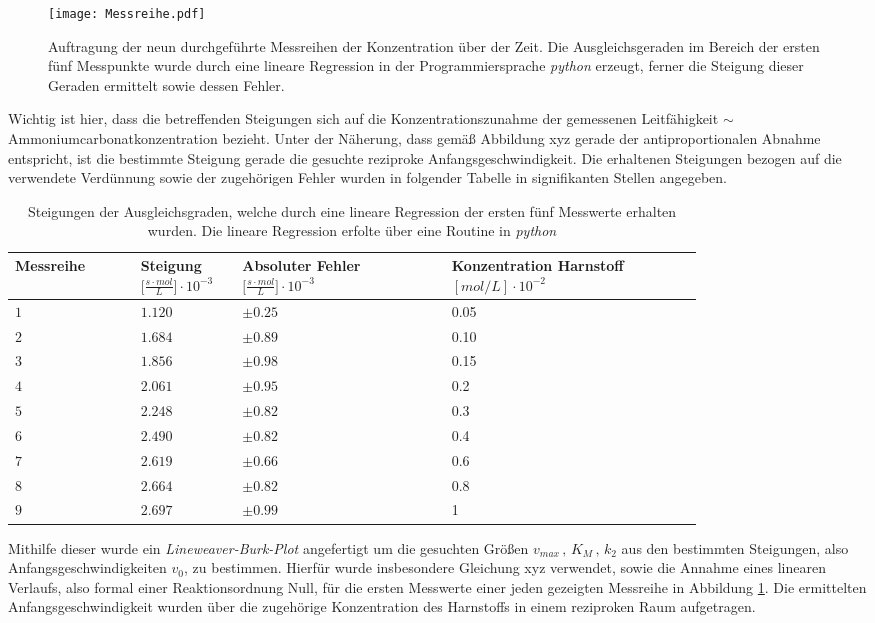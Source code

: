 \newpage
\begin{figure}[H]
	\centering	
	\begin{minipage}{1\textwidth}
		\texttt{[image: Messreihe.pdf]}
	\end{minipage}
	\caption{Auftragung der neun durchgeführte Messreihen der Konzentration über der Zeit. Die Ausgleichsgeraden im Bereich der ersten fünf Messpunkte wurde durch eine lineare Regression in der Programmiersprache \textit{python} erzeugt, ferner die Steigung dieser Geraden ermittelt sowie dessen Fehler.}
	\label{Messreihe}
\end{figure}
Wichtig ist hier, dass die betreffenden Steigungen sich auf die Konzentrationszunahme der gemessenen Leitfähigkeit $\sim $Ammoniumcarbonatkonzentration bezieht. Unter der Näherung, dass gemäß Abbildung xyz gerade der antiproportionalen Abnahme entspricht, ist die bestimmte Steigung gerade die gesuchte reziproke Anfangsgeschwindigkeit. Die erhaltenen Steigungen bezogen auf die verwendete Verdünnung sowie der zugehörigen Fehler wurden in folgender Tabelle in signifikanten Stellen angegeben.
\begin{table}[H]
\centering
\label{Steigungstabelle}
	\caption{Steigungen der Ausgleichsgraden, welche durch eine lineare Regression der ersten fünf Messwerte erhalten wurden. Die lineare Regression erfolte über eine Routine in \textit{python}}
	\begin{tabular}{C{0.15\linewidth}|C{0.1\linewidth}C{0.25\linewidth}C{0.3\linewidth}}
		Messreihe  &  Steigung $[\si{\frac{s\cdot mol}{L}] \cdot 10^{-3}}$ &  Absoluter Fehler $[\si{\frac{s \cdot mol}{L}] \cdot 10^{-3}}$ & Konzentration Harnstoff $\si{[mol/L]}\cdot 10^{-2}$ \\
		\hline \addlinespace[1ex] 
		$ 1$ & $1.120$ & $\pm 0.25$ & 0.05\\
		$2$ & $1.684$& $ \pm 0.89$ &0.10\\
		$3$ & $1.856$& $\pm 0.98$ &0.15\\
		$4$ &$2.061$& $\pm 0.95$&0.2\\
		$5$&  $2.248$&  $\pm 0.82$ &0.3\\
		$6$&  $2.490$&  $\pm 0.82$&0.4\\
		$7$ &  $2.619$&$\pm 0.66$&0.6\\
		$8$ & $2.664$&$\pm  0.82$ &0.8\\
		$9$ &  $2.697$& $\pm 0.99$ &1\\
	\end{tabular}
\end{table}
Mithilfe dieser wurde ein \textit{Lineweaver-Burk-Plot} angefertigt um die gesuchten Größen $v_{max}\, , \, K_M\, ,\, k_2$ aus den bestimmten Steigungen, also Anfangsgeschwindigkeiten $v_0$, zu bestimmen. Hierfür wurde insbesondere Gleichung xyz verwendet, sowie die Annahme eines linearen Verlaufs, also formal einer Reaktionsordnung Null, für die ersten Messwerte einer jeden gezeigten Messreihe in Abbildung \ref{Messreihe}. Die ermittelten Anfangsgeschwindigkeit wurden über die zugehörige Konzentration des Harnstoffs in einem reziproken Raum aufgetragen.

